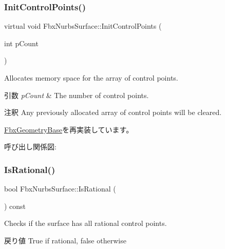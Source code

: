 \subsubsection{\texorpdfstring{Init\+Control\+Points()}{InitControlPoints()}\hspace{0.1cm}{\footnotesize\ttfamily [2/2]}}
{\footnotesize\ttfamily virtual void Fbx\+Nurbs\+Surface\+::\+Init\+Control\+Points (\begin{DoxyParamCaption}\item[{int}]{p\+Count }\end{DoxyParamCaption})\hspace{0.3cm}{\ttfamily [virtual]}}

Allocates memory space for the array of control points. 
\begin{DoxyParams}{引数}
{\em p\+Count} & The number of control points. \\
\hline
\end{DoxyParams}
\begin{DoxyRemark}{注釈}
Any previously allocated array of control points will be cleared. 
\end{DoxyRemark}


\hyperlink{class_fbx_geometry_base_a471b736f2595c006a338c07a61907127}{Fbx\+Geometry\+Base}を再実装しています。

呼び出し関係図\+:
\mbox{\label{class_fbx_nurbs_surface_a63da464e4d5624d7615c69047a922fca}} 
\subsubsection{\texorpdfstring{Is\+Rational()}{IsRational()}}
{\footnotesize\ttfamily bool Fbx\+Nurbs\+Surface\+::\+Is\+Rational (\begin{DoxyParamCaption}{ }\end{DoxyParamCaption}) const}

Checks if the surface has all rational control points. \begin{DoxyReturn}{戻り値}
{\ttfamily True} if rational, {\ttfamily false} otherwise 
\end{DoxyReturn}
\mbox{\label{class_fbx_nurbs_surface_a1187437512afcb9a2ea309255e4bee82}} 
